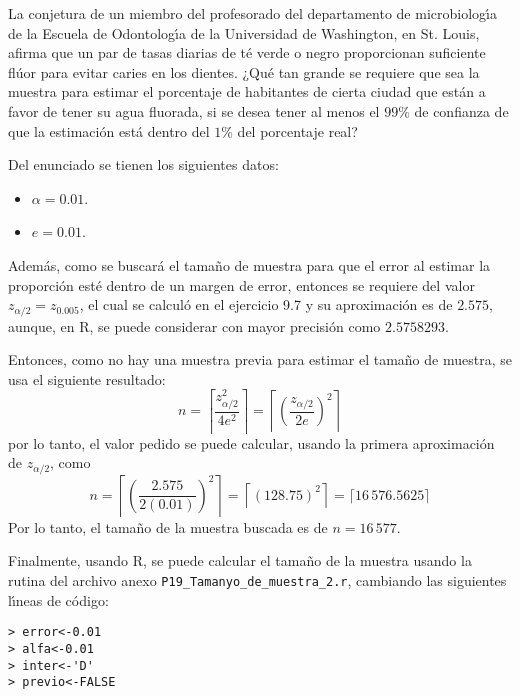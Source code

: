 \begin{enunciado}
 La conjetura de un miembro del profesorado del departamento de microbiolog\'{\i}a de la Escuela de Odontolog\'{\i}a de la Universidad de Washington, en St. Louis, afirma que un par de tasas diarias de t\'e verde o negro proporcionan suficiente fl\'uor para evitar caries en los dientes. ¿Qu\'e tan grande se requiere que sea la muestra para estimar el porcentaje de habitantes de cierta ciudad que est\'an a favor de tener su agua fluorada, si se desea tener al menos el $99\%$ de confianza de que la estimaci\'on est\'a dentro del $1\%$ del porcentaje real?
\end{enunciado}

\begin{solucion}
 Del enunciado se tienen los siguientes datos:
 \begin{itemize}
  \item $\alpha = 0.01$.
  \item $e = 0.01$.
 \end{itemize}
 Adem\'as, como se buscar\'a el tama\~no de muestra para que el error al estimar la proporci\'on est\'e dentro de un margen de error, entonces se requiere del valor $z_{\alpha/2} = z_{0.005}$, el cual se calcul\'o en el ejercicio 9.7 y su aproximaci\'on es de $2.575$, aunque, en R, se puede considerar con mayor precisi\'on como $2.5758293$.
 \par 
 Entonces, como no hay una muestra previa para estimar el tama\~no de muestra, se usa el siguiente resultado:
 \begin{equation*}
  n = \left\lceil \frac{z_{\alpha/2}^2}{4e^2} \right\rceil = \left\lceil \left( \frac{z_{\alpha/2}}{2e} \right)^2 \right\rceil
 \end{equation*}
 por lo tanto, el valor pedido se puede calcular, usando la primera aproximaci\'on de $z_{\alpha/2}$, como
 \begin{equation*}
  n = \left\lceil \left( \frac{2.575}{2(0.01)} \right)^2 \right\rceil = \left\lceil \left( 128.75 \right)^2 \right\rceil = \lceil 16\,576.5625 \rceil
 \end{equation*}
 Por lo tanto, el tama\~no de la muestra buscada es de $n = 16\,577$.
 \par 
 Finalmente, usando R, se puede calcular el tama\~no de la muestra usando la rutina del archivo anexo \texttt{P19\_Tamanyo\_de\_muestra\_2.r}, cambiando las siguientes l\'{\i}neas de c\'odigo:
 \begin{verbatim}
> error<-0.01
> alfa<-0.01
> inter<-'D'
> previo<-FALSE
 \end{verbatim}

\end{solucion}
